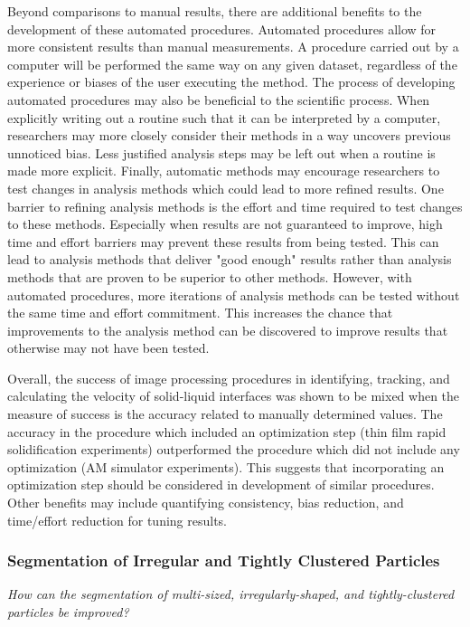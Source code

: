 Beyond comparisons to manual results, there are additional benefits
to the development of these automated procedures.
Automated procedures allow for more consistent results
than manual measurements. A procedure carried out by a computer will be
performed the same way on any given dataset, regardless of the experience or
biases of the user executing the method.
The process of developing automated procedures may also be beneficial to
the scientific process. When explicitly writing out a routine such that
it can be interpreted by a computer, researchers may more closely consider
their methods in a way uncovers previous unnoticed bias. Less justified
analysis steps may be left out when a routine is made more explicit.
Finally, automatic methods may encourage researchers to test changes in
analysis methods which could lead to more refined results.
One barrier to refining analysis methods is the effort and time required to
test changes to these methods. Especially when results are not guaranteed to
improve, high time and effort barriers may prevent these results from being
tested. This can lead to analysis methods that deliver "good enough" results
rather than analysis methods that are proven to be superior to other methods.
However, with automated procedures, more iterations of analysis methods can
be tested without the same time and effort commitment. This increases the
chance that improvements to the analysis method can be discovered to improve
results that otherwise may not have been tested.

Overall, the success of image processing procedures in identifying, tracking,
and calculating the velocity of solid-liquid interfaces was shown to be mixed
when the measure of success is the accuracy related to manually determined
values. The accuracy in the procedure which included an optimization
step (thin film rapid solidification experiments) outperformed the procedure
which did not include any optimization (AM simulator experiments). This
suggests that incorporating an optimization step should be considered in
development of similar procedures. Other benefits may include quantifying
consistency, bias reduction, and time/effort reduction for tuning results.

\subsubsection{Segmentation of Irregular and Tightly Clustered Particles}
\noindent \textit{
    How can the segmentation of multi-sized, irregularly-shaped, and
    tightly-clustered particles be improved?
}

